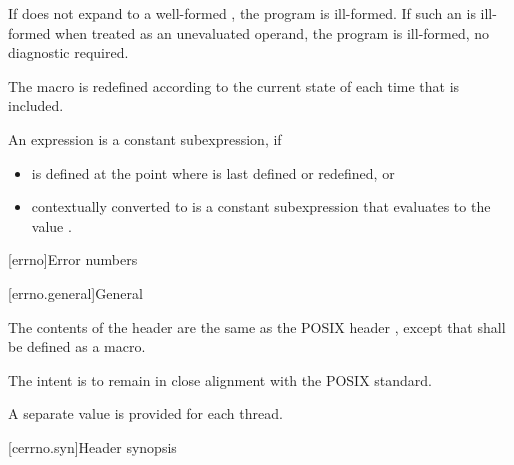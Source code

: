 \pnum
If  does not expand to
a  well-formed ,
the program is ill-formed.
If such an  is ill-formed when
treated as an unevaluated operand,
the program is ill-formed, no diagnostic required.

\pnum
The macro  is redefined according to
the current state of  each time that
 is included.

\pnum
An expression 
is a constant subexpression, if
\begin{itemize}
\item
{} is defined at the point where 
is last defined or redefined, or
\item
{} contextually converted to 
is a constant subexpression that evaluates to the value .
\end{itemize}

[errno]{Error numbers}

[errno.general]{General}

\pnum
The contents of the header  are the same as the POSIX header
, except that  shall be defined as a macro.
\begin{note}
The intent is to remain in close alignment with the POSIX standard.
\end{note}
A separate  value is provided for each thread.

[cerrno.syn]{Header  synopsis}

